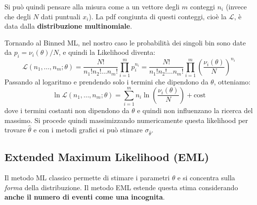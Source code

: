\documentclass[openany,a4paper,12pt]{book}
\providecommand{\mathscr}[1]{\mathcal{#1}}
\theoremstyle{remark}
\begin{document}
Si può quindi pensare alla misura come a un vettore degli $m$ conteggi $n_i$ (invece che degli $N$ dati puntuali $x_i$). La pdf congiunta di questi conteggi, cioè la $\mathscr{L}$, è data dalla \textbf{distribuzione multinomiale}.

\noindent{}
\vspace{0.5cm}

Tornando al Binned ML, nel nostro caso le probabilità dei singoli bin sono date da $p_i = \nu_i(\theta) / N$, e quindi la Likelihood diventa:
\begin{equation}
    \mathscr{L}(n_1, \dots, n_m ; \theta) = \frac{N!}{n_1! n_2! \dots n_m!} \prod_{i=1}^{m} p_{i}^{n_i} =  \frac{N!}{n_1! n_2! \dots n_m!} \prod_{i=1}^{m} \left( \frac{\nu_i(\theta)}{N} \right)^{n_i} 
\end{equation}
Passando al logaritmo e prendendo solo i termini che dipendono da $\theta$, otteniamo:
\begin{equation}
    \ln \mathscr{L}(n_1, \dots, n_m ; \theta) = \sum_{i=1}^{m} n_i \ln \left( \frac{\nu_i(\theta)}{N} \right) + \text{cost}
\end{equation}
dove i termini costanti non dipendono da $\theta$ e quindi non influenzano la ricerca del massimo. Si procede quindi massimizzando numericamente questa likelihood per trovare $\hat{\theta}$ e con i metodi grafici si può stimare $\sigma_{\hat{\theta}}$.

\subsection{Extended Maximum Likelihood (EML)}
Il metodo ML classico permette di stimare i parametri $\theta$ e si concentra sulla \textit{forma} della distribuzione. Il metodo EML estende questa stima considerando \textbf{anche il numero di eventi come una incognita}. 
\end{document}
